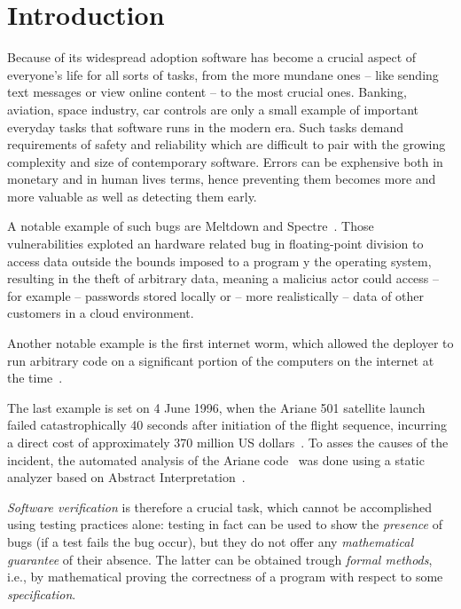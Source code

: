 \chapter*{Introduction}\label{ch:intro}

Because of its widespread adoption software has become a crucial
aspect of everyone's life for all sorts of tasks, from the more
mundane ones -- like sending text messages or view online content --
to the most crucial ones. Banking, aviation, space industry, car
controls are only a small example of important everyday tasks that
software runs in the modern era. Such tasks demand requirements of
safety and reliability which are difficult to pair with the growing
complexity and size of contemporary software. Errors can be exphensive
both in monetary and in human lives terms, hence preventing them
becomes more and more valuable as well as detecting them early.

A notable example of such bugs are Meltdown and
Spectre~\cite{art:meltdown,art:spectre}. Those vulnerabilities
exploted an hardware related bug in floating-point division to access
data outside the bounds imposed to a program y the operating system,
resulting in the theft of arbitrary data, meaning a malicius actor
could access -- for example -- passwords stored locally or -- more
realistically -- data of other customers in a cloud environment.

Another notable example is the first internet worm, which allowed the
deployer to run arbitrary code on a significant portion of the
computers on the internet at the
time~\cite{art:worm1,art:worm2,art:worm3,art:worm4}.

The last example is set on 4 June 1996, when the Ariane 501 satellite
launch failed catastrophically 40 seconds after initiation of the
flight sequence, incurring a direct cost of approximately 370 million
US dollars~\cite{10.1145/251880.251992}. To asses the causes of the
incident, the automated analysis of the Ariane
code~\cite{art:arianecode} was done using a static analyzer based on
Abstract Interpretation~\cite{art:arianeabstract}.

\emph{Software verification} is therefore a crucial task, which cannot
be accomplished using testing practices alone: testing in fact can be
used to show the \emph{presence} of bugs (if a test fails the bug
occur), but they do not offer any \emph{mathematical guarantee} of
their absence. The latter can be obtained trough \emph{formal
  methods}, i.e., by mathematical proving the correctness of a program
with respect to some \emph{specification}.

